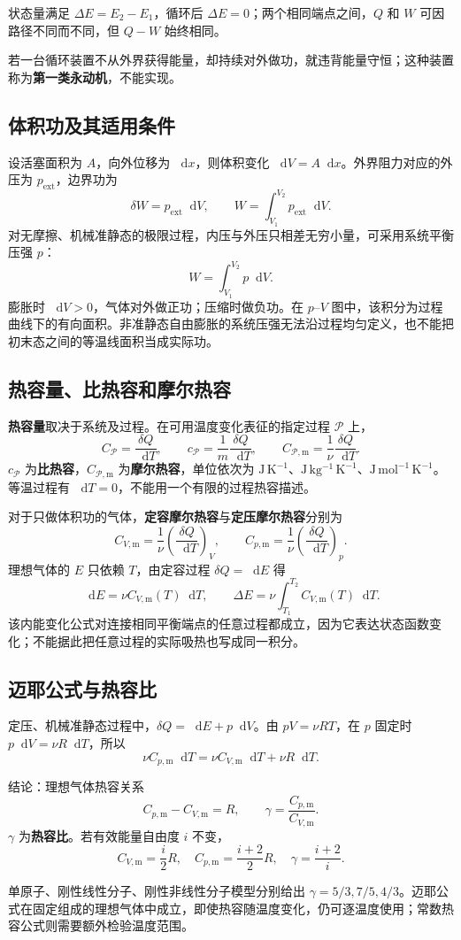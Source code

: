 \documentclass[UTF8,fontset=none,zihao=-4,a4paper]{ctexart}
\newcommand{\term}[1]{\textbf{#1}}
\newcommand{\dd}{\mathop{}\!\mathrm{d}}
\begin{document}
状态量满足 $\Delta E=E_2-E_1$，循环后 $\Delta E=0$；两个相同端点之间，$Q$ 和 $W$ 可因路径不同而不同，但 $Q-W$ 始终相同。

若一台循环装置不从外界获得能量，却持续对外做功，就违背能量守恒；这种装置称为\term{第一类永动机}，不能实现。

\subsection{体积功及其适用条件}
设活塞面积为 $A$，向外位移为 $\dd x$，则体积变化 $\dd V=A\dd x$。外界阻力对应的外压为 $p_{\mathrm{ext}}$，边界功为
\[
 \delta W=p_{\mathrm{ext}}\dd V,
 \qquad W=\int_{V_1}^{V_2}p_{\mathrm{ext}}\dd V.
\]
对无摩擦、机械准静态的极限过程，内压与外压只相差无穷小量，可采用系统平衡压强 $p$：
\[
 W=\int_{V_1}^{V_2}p\dd V.
\]
膨胀时 $\dd V>0$，气体对外做正功；压缩时做负功。在 $p$--$V$ 图中，该积分为过程曲线下的有向面积。非准静态自由膨胀的系统压强无法沿过程均匀定义，也不能把初末态之间的等温线面积当成实际功。

\subsection{热容量、比热容和摩尔热容}
\term{热容量}取决于系统及过程。在可用温度变化表征的指定过程 $\mathcal P$ 上，
\[
 C_{\mathcal P}=\frac{\delta Q}{\dd T},\qquad
 c_{\mathcal P}=\frac1m\frac{\delta Q}{\dd T},\qquad
 C_{\mathcal P,\mathrm m}=\frac1\nu\frac{\delta Q}{\dd T}.
\]
$c_{\mathcal P}$ 为\term{比热容}，$C_{\mathcal P,\mathrm m}$ 为\term{摩尔热容}，单位依次为 $\mathrm{J\,K^{-1}}$、$\mathrm{J\,kg^{-1}\,K^{-1}}$、$\mathrm{J\,mol^{-1}\,K^{-1}}$。等温过程有 $\dd T=0$，不能用一个有限的过程热容描述。

对于只做体积功的气体，\term{定容摩尔热容}与\term{定压摩尔热容}分别为
\[
 C_{V,\mathrm m}=\frac1\nu\left(\frac{\delta Q}{\dd T}\right)_V,
 \qquad
 C_{p,\mathrm m}=\frac1\nu\left(\frac{\delta Q}{\dd T}\right)_p.
\]
理想气体的 $E$ 只依赖 $T$，由定容过程 $\delta Q=\dd E$ 得
\[
 \dd E=\nu C_{V,\mathrm m}(T)\dd T,
 \qquad \Delta E=\nu\int_{T_1}^{T_2}C_{V,\mathrm m}(T)\dd T.
\]
该内能变化公式对连接相同平衡端点的任意过程都成立，因为它表达状态函数变化；不能据此把任意过程的实际吸热也写成同一积分。

\subsection{迈耶公式与热容比}
定压、机械准静态过程中，$\delta Q=\dd E+p\dd V$。由 $pV=\nu RT$，在 $p$ 固定时 $p\dd V=\nu R\dd T$，所以
\[
 \nu C_{p,\mathrm m}\dd T
 =\nu C_{V,\mathrm m}\dd T+\nu R\dd T.
\]
\begin{infobox}{结论：理想气体热容关系}
\[
 C_{p,\mathrm m}-C_{V,\mathrm m}=R,
 \qquad \gamma=\frac{C_{p,\mathrm m}}{C_{V,\mathrm m}}.
\]
$\gamma$ 为\term{热容比}。若有效能量自由度 $i$ 不变，
\[
 C_{V,\mathrm m}=\frac i2R,\quad
 C_{p,\mathrm m}=\frac{i+2}{2}R,\quad
 \gamma=\frac{i+2}{i}.
\]
\end{infobox}
单原子、刚性线性分子、刚性非线性分子模型分别给出 $\gamma=5/3,7/5,4/3$。迈耶公式在固定组成的理想气体中成立，即使热容随温度变化，仍可逐温度使用；常数热容公式则需要额外检验温度范围。
\end{document}
